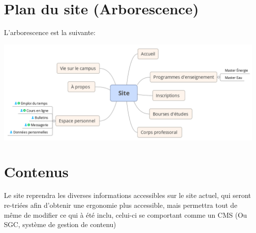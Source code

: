 \documentclass[oneside]{report}
\begin{document}
{		\section{Plan du site (Arborescence)}
		\par L'arborescence est la suivante:\\
		\begin{center}
			\includegraphics[scale=1.5]{arborescence}
		\end{center}
		\section{Contenus}
		{
			\par Le site reprendra les diverses informations accessibles sur le site actuel, qui seront re-triées afin d’obtenir une ergonomie plus accessible, mais permettra tout de même de modifier ce qui à été inclu, celui-ci se comportant comme un CMS (Ou SGC, système de gestion de contenu)
		}

}
\end{document}
